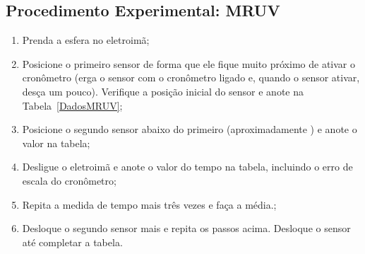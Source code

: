 \subsection{Procedimento Experimental: MRUV}

\begin{enumerate}
	\item Prenda a esfera no eletroimã;
	\item Posicione o primeiro sensor de forma que ele fique muito próximo de ativar o cronômetro (erga o sensor com o cronômetro ligado e, quando o sensor ativar, desça um pouco). Verifique a posição inicial do sensor e anote na Tabela~\ref{DadosMRUV};
	\item Posicione o segundo sensor abaixo do primeiro (aproximadamente ) e anote o valor na tabela;
	\item Desligue o eletroimã e anote o valor do tempo na tabela, incluindo o erro de escala do cronômetro;
	\item Repita a medida de tempo mais três vezes e faça a média.;
	\item Desloque o segundo sensor mais  e repita os passos acima. Desloque o sensor até completar a tabela.
\end{enumerate}

\cleardoublepage


\vspace{15mm}

\begin{fullwidth}
\noindent{}
\vspace{5mm}

\noindent{}

\noindent{}

\noindent{}

\noindent{}

\noindent{}
\end{fullwidth}

